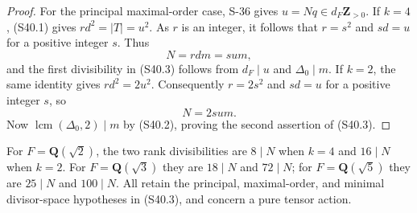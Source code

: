 \begin{proof}
For the principal maximal-order case, S-36 gives
$u=Nq\in d_F\mathbf Z_{>0}$. If $k=4$, (S40.1) gives
$rd^2=|T|=u^2$. As $r$ is an integer, it follows that
$r=s^2$ and $sd=u$ for a positive integer $s$. Thus
\[
 N=rdm=s u m,
\]
and the first divisibility in (S40.3) follows from
$d_F\mid u$ and $\Delta_0\mid m$.
If $k=2$, the same identity gives $rd^2=2u^2$.
Consequently $r=2s^2$ and $sd=u$ for a positive integer $s$,
so
\[
 N=2s u m.
\]
Now $\operatorname{lcm}(\Delta_0,2)\mid m$ by (S40.2), proving
the second assertion of (S40.3).
\end{proof}

\begin{remark}
For $F=\mathbf Q(\sqrt2)$, the two rank divisibilities are
$8\mid N$ when $k=4$ and $16\mid N$ when $k=2$.
For $F=\mathbf Q(\sqrt3)$ they are $18\mid N$ and $72\mid N$;
for $F=\mathbf Q(\sqrt5)$ they are $25\mid N$ and $100\mid N$.
All retain the principal, maximal-order, and minimal divisor-space
hypotheses in (S40.3), and concern a pure tensor action.
\end{remark}
